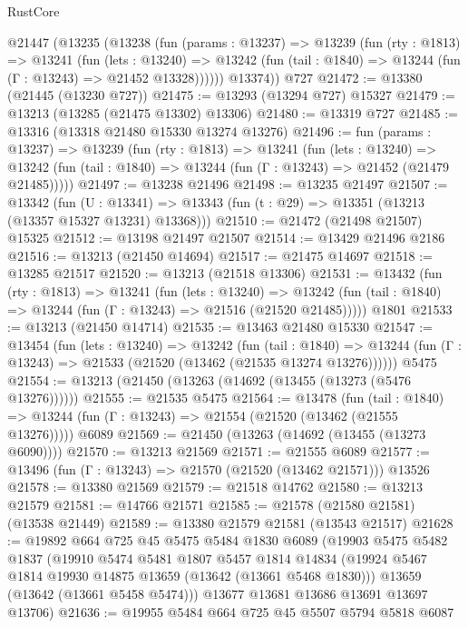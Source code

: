 \begin{lexlean}{RustCore}
\begin{coremodule}
    @21447
      (@13235
        (@13238
          (fun (params : @13237) =>
          @13239
            (fun (rty : @1813) =>
            @13241
              (fun (lets : @13240) =>
              @13242 (fun (tail : @1840) => @13244 (fun (Γ : @13243) => @21452 @13328))))))
        @13374))
    @727
@21472 := @13380 (@21445 (@13230 @727))
@21475 := @13293 (@13294 @727) @15327
@21479 := @13213 (@13285 (@21475 @13302) @13306)
@21480 := @13319 @727
@21485 := @13316 (@13318 @21480 @15330 @13274 @13276)
@21496 := fun (params : @13237) =>
  @13239
    (fun (rty : @1813) =>
    @13241
      (fun (lets : @13240) =>
      @13242 (fun (tail : @1840) => @13244 (fun (Γ : @13243) => @21452 (@21479 @21485)))))
@21497 := @13238 @21496
@21498 := @13235 @21497
@21507 := @13342
    (fun (U : @13341) => @13343 (fun (t : @29) => @13351 (@13213 (@13357 @15327 @13231) @13368)))
@21510 := @21472 (@21498 @21507) @15325
@21512 := @13198 @21497 @21507
@21514 := @13429 @21496 @2186
@21516 := @13213 (@21450 @14694)
@21517 := @21475 @14697
@21518 := @13285 @21517
@21520 := @13213 (@21518 @13306)
@21531 := @13432
    (fun (rty : @1813) =>
    @13241
      (fun (lets : @13240) =>
      @13242 (fun (tail : @1840) => @13244 (fun (Γ : @13243) => @21516 (@21520 @21485)))))
    @1801
@21533 := @13213 (@21450 @14714)
@21535 := @13463 @21480 @15330
@21547 := @13454
    (fun (lets : @13240) =>
    @13242
      (fun (tail : @1840) =>
      @13244 (fun (Γ : @13243) => @21533 (@21520 (@13462 (@21535 @13274 @13276))))))
    @5475
@21554 := @13213 (@21450 (@13263 (@14692 (@13455 (@13273 (@5476 @13276))))))
@21555 := @21535 @5475
@21564 := @13478
    (fun (tail : @1840) => @13244 (fun (Γ : @13243) => @21554 (@21520 (@13462 (@21555 @13276)))))
    @6089
@21569 := @21450 (@13263 (@14692 (@13455 (@13273 @6090))))
@21570 := @13213 @21569
@21571 := @21555 @6089
@21577 := @13496 (fun (Γ : @13243) => @21570 (@21520 (@13462 @21571))) @13526
@21578 := @13380 @21569
@21579 := @21518 @14762
@21580 := @13213 @21579
@21581 := @14766 @21571
@21585 := @21578 (@21580 @21581) (@13538 @21449)
@21589 := @13380 @21579 @21581 (@13543 @21517)
@21628 := @19892
    @664
    @725
    @45
    @5475
    @5484
    @1830
    @6089
    (@19903
      @5475
      @5482
      @1837
      (@19910
        @5474
        @5481
        @1807
        @5457
        @1814
        @14834
        (@19924 @5467 @1814 @19930 @14875 @13659 (@13642 (@13661 @5468 @1830)))
        @13659
        (@13642 (@13661 @5458 @5474)))
      @13677
      @13681
      @13686
      @13691
      @13697
      @13706)
@21636 := @19955 @5484 @664 @725 @45 @5507 @5794 @5818 @6087

\end{coremodule}
\end{lexlean}
